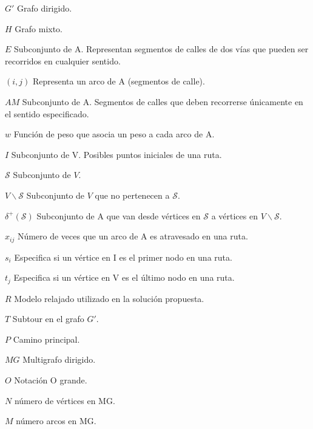 \begin{abbreviations}
    \item[$G'$] Grafo dirigido.
    \item[$H$] Grafo mixto.
    \item[$E$] Subconjunto de A. Representan segmentos de calles de dos vías que pueden ser recorridos en cualquier sentido.
    \item[$(i,j)$] Representa un arco de A (segmentos de calle).
    \item[$AM$] Subconjunto de A. Segmentos de calles que deben recorrerse únicamente en el sentido especificado.
    \item[$w$] Función de peso que asocia un peso a cada arco de A.
    \item[$I$] Subconjunto de V. Posibles puntos iniciales de una ruta.
    \item[$\mathcal{S}$] Subconjunto de $V$.
    \item[$V \backslash \mathcal{S}$] Subconjunto de $V$ que no pertenecen a $\mathcal{S}$.
    \item[$\delta^+ (\mathcal{S})$] Subconjunto de A que van desde vértices en $\mathcal{S}$ a vértices en $V \backslash \mathcal{S}$.
    \item[$x_{i j}$] Número de veces que un arco de A es atravesado en una ruta.
    \item[$s_i$] Especifica si un vértice en I es el primer nodo en una ruta.
    \item[$t_j$] Especifica si un vértice en V es el último nodo en una ruta.
    \item[$R$] Modelo relajado utilizado en la solución propuesta.
    \item[$T$] Subtour en el grafo $G'$.
    \item[$P$] Camino principal.
    
    \item[$MG$] Multigrafo dirigido.
    \item[$O$] Notación O grande.
    \item[$N$] número de vértices en MG.
    \item[$M$] número arcos en MG.
    

\end{abbreviations}
